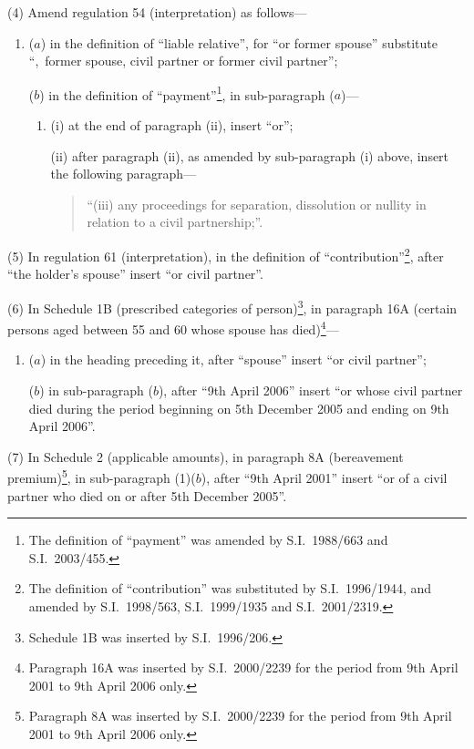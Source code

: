 \documentclass[12pt,a4paper]{article}
\begin{document}
(4) Amend regulation 54 (interpretation) as follows—
\begin{enumerate}\item[]
($a$) in the definition of “liable relative”, for “or former spouse” substitute “,~former spouse, civil partner or former civil partner”;

($b$) in the definition of “payment”\footnote{The definition of “payment” was amended by S.I.\ 1988/663 and S.I.\ 2003/455.}, in sub-paragraph ($a$)—
\begin{enumerate}\item[]
(i) at the end of paragraph (ii), insert “or”;

(ii) after paragraph (ii), as amended by sub-paragraph (i)  above, insert the following paragraph—
\begin{quotation}
“(iii) any proceedings for separation, dissolution or nullity in relation to a civil partnership;”.
\end{quotation}
\end{enumerate}
\end{enumerate}

(5) In regulation 61 (interpretation), in the definition of “contribution”\footnote{The definition of “contribution” was substituted by S.I.\ 1996/1944, and amended by S.I.\ 1998/563, S.I.\ 1999/1935 and S.I.\ 2001/2319.}, after “the holder’s spouse” insert “or civil partner”.

(6) In Schedule 1B (prescribed categories of person)\footnote{Schedule 1B was inserted by S.I.\ 1996/206.}, in paragraph 16A (certain persons aged between 55 and 60 whose spouse has died)\footnote{Paragraph 16A was inserted by S.I.\ 2000/2239 for the period from 9th April 2001 to 9th April 2006 only.}—
\begin{enumerate}\item[]
($a$) in the heading preceding it, after “spouse” insert “or civil partner”;

($b$) in sub-paragraph ($b$), after “9th April 2006” insert “or whose civil partner died during the period beginning on 5th December 2005 and ending on 9th April 2006”.
\end{enumerate}

(7) In Schedule 2 (applicable amounts), in paragraph 8A (bereavement premium)\footnote{Paragraph 8A was inserted by S.I.\ 2000/2239 for the period from 9th April 2001 to 9th April 2006 only.}, in sub-paragraph (1)($b$), after “9th April 2001” insert “or of a civil partner who died on or after 5th December 2005”.
\end{document}

